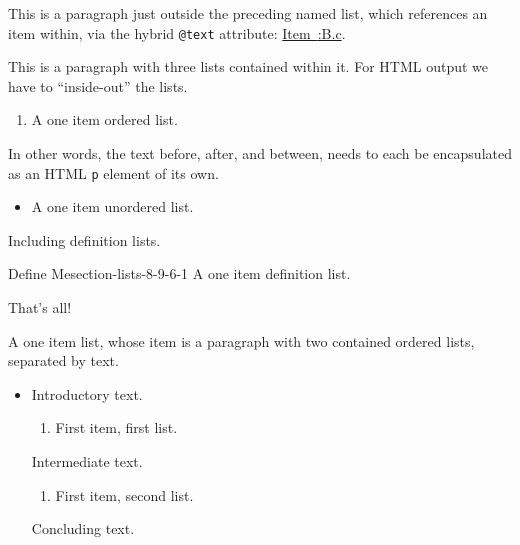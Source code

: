 \documentclass[pdflatex]{sn-jnl}
\theoremstyle{thmstyleone}%
\theoremstyle{thmstyletwo}%
\theoremstyle{thmstylethree}%
\newcommand{\xreffont}{\relax}
\newcommand{\mono}[1]{\texttt{#1}}
\numberwithin{equation}{section}
\begin{document}
This is a paragraph just outside the preceding named list, which references an item within, via the hybrid \mono{@text} attribute:  \hyperlink{target-item}{Item~{\xreffont 12.4:B.c}}.%
\par
{}This is a paragraph with three lists contained within it.  For HTML output we have to ``inside-out'' the lists.%
\begin{enumerate}
\item{}A one item ordered list.%
\end{enumerate}
In other words, the text before, after, and between, needs to each be encapsulated as an HTML \mono{p} element of its own.%
\begin{itemize}[label=\textbullet]
\item{}A one item unordered list.%
\end{itemize}
Including definition lists.%
\begin{descriptionlist}
\begin{dlimedium}{Define Me}{section-lists-8-9-6-1}%
A one item definition list.%
\end{dlimedium}%
\end{descriptionlist}
That's all!%
\par
A one item list, whose item is a paragraph with two contained ordered lists, separated by text.%
\begin{itemize}[label=$\blacksquare$]
\item{}Introductory text.%
\begin{enumerate}[label={\Alph*}]
\item{}First item, first list.%
\end{enumerate}
Intermediate text.%
\begin{enumerate}[label={\alph*}]
\item{}First item, second list.%
\end{enumerate}
Concluding text.%
\end{itemize}
%
%
%
\typeout{************************************************}
\typeout{************************************************}
%
\end{document}
